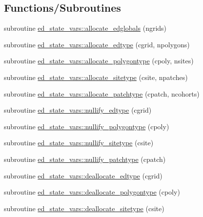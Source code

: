 \subsection*{Functions/\+Subroutines}
\begin{DoxyCompactItemize}
\item 
subroutine \hyperlink{namespaceed__state__vars_a01c02fd632892eb11eaac0daacc106d2}{ed\+\_\+state\+\_\+vars\+::allocate\+\_\+edglobals} (ngrids)
\item 
subroutine \hyperlink{namespaceed__state__vars_aa47dd5e1964efcbfa0844f75d1763ce5}{ed\+\_\+state\+\_\+vars\+::allocate\+\_\+edtype} (cgrid, npolygons)
\item 
subroutine \hyperlink{namespaceed__state__vars_ad14e882e6c902118f0e369dd846eeedf}{ed\+\_\+state\+\_\+vars\+::allocate\+\_\+polygontype} (cpoly, nsites)
\item 
subroutine \hyperlink{namespaceed__state__vars_ac3b987ebbdc7c8cd956eb2634010edb9}{ed\+\_\+state\+\_\+vars\+::allocate\+\_\+sitetype} (csite, npatches)
\item 
subroutine \hyperlink{namespaceed__state__vars_a4837fc010e19721a127c9a8b04874594}{ed\+\_\+state\+\_\+vars\+::allocate\+\_\+patchtype} (cpatch, ncohorts)
\item 
subroutine \hyperlink{namespaceed__state__vars_a0df5f674bdb76d915f34b1c6987f6815}{ed\+\_\+state\+\_\+vars\+::nullify\+\_\+edtype} (cgrid)
\item 
subroutine \hyperlink{namespaceed__state__vars_ade6f2776a02bd9a26ee31fe75cda6170}{ed\+\_\+state\+\_\+vars\+::nullify\+\_\+polygontype} (cpoly)
\item 
subroutine \hyperlink{namespaceed__state__vars_aa13b6faa5a0031bd5df50581ac0db0ff}{ed\+\_\+state\+\_\+vars\+::nullify\+\_\+sitetype} (csite)
\item 
subroutine \hyperlink{namespaceed__state__vars_af1a07724c13a8dceb6ba2d3dab21b899}{ed\+\_\+state\+\_\+vars\+::nullify\+\_\+patchtype} (cpatch)
\item 
subroutine \hyperlink{namespaceed__state__vars_a1d9621375d0d298946b3cd93b47980b9}{ed\+\_\+state\+\_\+vars\+::deallocate\+\_\+edtype} (cgrid)
\item 
subroutine \hyperlink{namespaceed__state__vars_abea5ee3b5bbe881d86ca62b4de939db3}{ed\+\_\+state\+\_\+vars\+::deallocate\+\_\+polygontype} (cpoly)
\item 
subroutine \hyperlink{namespaceed__state__vars_a29881891f67226b191026267f094beb9}{ed\+\_\+state\+\_\+vars\+::deallocate\+\_\+sitetype} (csite)
\item 

\end{DoxyCompactItemize}

